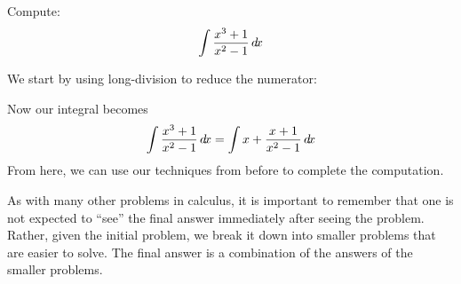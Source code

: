 \documentclass{ximera}
\begin{document}
\begin{example}
  Compute:
  \[
  \int \frac{x^3+1}{x^2-1} \mathop{}\!d\! x
  \]
  \begin{explanation}
    We start by using long-division to reduce the numerator:
    \begin{center}%
    \end{center}
    Now our integral becomes
    \[
    \int \frac{x^3+1}{x^2-1}\mathop{}\!d\! x = \int x+ \frac{x+1}{x^2-1}\mathop{}\!d\! x
    \]
    From here, we can use our techniques from before to complete the
    computation.
  \end{explanation}
\end{example}
    


As with many other problems in calculus, it is important to remember
that one is not expected to ``see'' the final answer immediately after
seeing the problem. Rather, given the initial problem, we break it
down into smaller problems that are easier to solve. The final answer
is a combination of the answers of the smaller problems.
\end{document}
